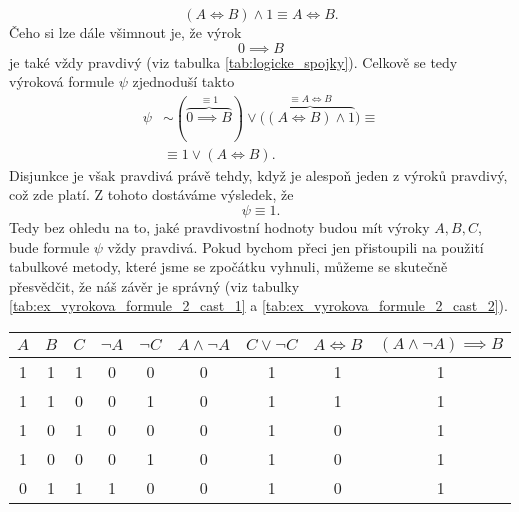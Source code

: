 \begin{example}
\begin{solution}
        \begin{equation*}
            (A \iff B) \land 1 \equiv  A \iff B.
        \end{equation*}
        Čeho si lze dále všimnout je, že výrok
        \begin{equation*}
            0 \implies B
        \end{equation*}
        je také vždy pravdivý (viz tabulka \ref{tab:logicke_spojky}). Celkově se tedy výroková formule $\psi$ zjednoduší takto
        \begin{align*}
            \psi&\sim (\overbrace{0 \implies B}^{\equiv 1}) \lor \big(\overbrace{(A \iff B) \land 1}^{\equiv A \iff B}\big)\equiv  \\ &\equiv 1 \lor (A \iff B).
        \end{align*}
        Disjunkce je však pravdivá právě tehdy, když je alespoň jeden z výroků pravdivý, což zde platí. Z tohoto dostáváme výsledek, že
        \begin{equation*}
            \psi\equiv 1.
        \end{equation*}
        Tedy bez ohledu na to, jaké pravdivostní hodnoty budou mít výroky $A,B,C$, bude formule $\psi$ vždy pravdivá. Pokud bychom přeci jen přistoupili na použití tabulkové metody, které jsme se zpočátku vyhnuli, můžeme se skutečně přesvědčit, že náš závěr je správný (viz tabulky \ref{tab:ex_vyrokova_formule_2_cast_1} a \ref{tab:ex_vyrokova_formule_2_cast_2}).
        \begin{table}[h]
            \centering
            \begin{tabular}{|ccc|cccccc|}
            \hline
            $A$ & $B$ & $C$ & $\neg A$ & $\neg C$ & $A \land \neg A$ & $C \lor \neg C$ & $A \iff B$ & $(A \land \neg A) \implies B$ \\ \hline
            1   & 1   & 1   & 0        & 0        & 0                & 1                 & 1          & 1                             \\
            1   & 1   & 0   & 0        & 1        & 0                & 1                 & 1          & 1                             \\
            1   & 0   & 1   & 0        & 0        & 0                & 1                 & 0          & 1                             \\
            1   & 0   & 0   & 0        & 1        & 0                & 1                 & 0          & 1                             \\
            0   & 1   & 1   & 1        & 0        & 0                & 1                 & 0          & 1                             \\

\end{tabular}
\end{table}
\end{solution}
\end{example}
